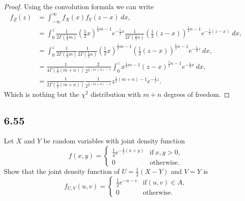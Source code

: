 \documentclass{article}
\begin{document}
\begin{proof}
    Using the convolution formula we can write
    \begin{align*}
        f_Z(z) & = \int_{-\infty}^\infty f_X(x)f_Y(z-x) \ dx,                           \\
               & = \int_0^z
        \frac{1}{2\Gamma(\frac{1}{2}m)}\left(\frac{1}{2}x\right)^{\frac{1}{2}m-1}
        e^{-\frac{1}{2}x}\frac{1}{2\Gamma(\frac{1}{2}n)}
        \left(\frac{1}{2}(z-x)\right)^{\frac{1}{2}n-1}e^{-\frac{1}{2}(z-x)} \ dx,       \\
               & = \int_0^z
        \frac{1}{2\Gamma(\frac{1}{2}m)}\frac{1}{2\Gamma(\frac{1}{2}n)}
        \left(\frac{1}{2}x\right)^{\frac{1}{2}m-1}\left(\frac{1}{2}(z-x)\right)^{\frac{1}{2}n-1}
        e^{-\frac{1}{2}z} \ dx,                                                         \\
               & = \frac{1}{4\Gamma(\frac{1}{2}(m + n))}
        \frac{2}{2^{\frac{1}{2}(m+n)-1}} \int_0^z
        x^{\frac{1}{2}m-1}(z-x)^{\frac{1}{2}n-1}e^{-\frac{1}{2}x} \ dx,                 \\
               & =\frac{1}{2\Gamma(\frac{1}{2}(m + n))}\frac{1}{2^{\frac{1}{2}(m+n)-1}}
        z^{\frac{1}{2}(m+n)-1}e^{-\frac{1}{2}z}.
    \end{align*}
    Which is nothing but the $\chi^2$ distribution with $m+n$ degrees
    of freedom.
\end{proof}

\subsection*{6.55}
Let $X$ and $Y$ be random variables with joint density function
\begin{equation*}
    f(x,y) = \begin{cases}
        \frac{1}{4}e^{-\frac{1}{2}(x+y)} & \text{if} \ x,y>0, \\
        0                                & \text{otherwise.}
    \end{cases}
\end{equation*}
Show that the joint density function of $U=\frac{1}{2}(X-Y)$ and
$V=Y$ is
\begin{equation*}
    f_{U,V}(u,v) = \begin{cases}
        \frac{1}{2}e^{-u-v} & \text{if} (u,v) \in A, \\
        0                   & \text{otherwise}.
    \end{cases}
\end{equation*}
\end{document}

